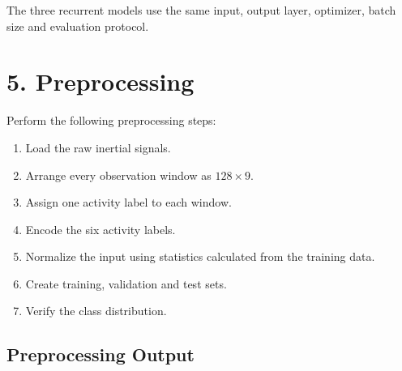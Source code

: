 \documentclass[10pt]{article}
\begin{document}
The three recurrent models use the same input, output layer, optimizer,
batch size and evaluation protocol.

\section*{5. Preprocessing}

Perform the following preprocessing steps:

\begin{enumerate}
\item Load the raw inertial signals.
\item Arrange every observation window as $128\times9$.
\item Assign one activity label to each window.
\item Encode the six activity labels.
\item Normalize the input using statistics calculated from the training data.
\item Create training, validation and test sets.
\item Verify the class distribution.
\end{enumerate}

\subsection*{Preprocessing Output}
\end{document}
